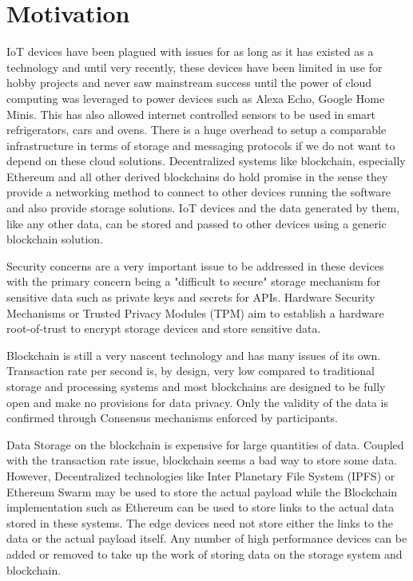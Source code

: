 \documentclass[11pt,openright]{report}
\begin{document}
\section{Motivation}\label{section:motivation}
IoT devices have been plagued with issues for as long as it has existed as a technology and until very recently, these devices have been limited in use for hobby projects and never saw mainstream success until the power of cloud computing was leveraged to power devices such as Alexa Echo, Google Home Minis. This has also allowed internet controlled sensors to be used in smart refrigerators, cars and ovens. There is a huge overhead to setup a comparable infrastructure in terms of storage and messaging protocols if we do not want to depend on these cloud solutions. Decentralized systems like blockchain, especially Ethereum \cite{7467408}  and all other derived blockchains do hold promise in the sense they provide a networking method to connect to other devices running the software and also provide storage solutions. IoT devices and the data generated by them, like any other data, can be stored and passed to other devices using a generic blockchain solution.

Security concerns are a very important issue to be addressed in these devices with the primary concern being a "difficult to secure" storage mechanism for sensitive data such as private keys and secrets for APIs. Hardware Security Mechanisms or Trusted Privacy Modules (TPM) aim to establish a hardware root-of-trust to encrypt storage devices and store sensitive data.

Blockchain is still a very nascent technology and has many issues of its own. Transaction rate per second is, by design, very low compared to traditional storage and processing systems and most blockchains are designed to be fully open and make no provisions for data privacy. Only the validity of the data is confirmed through Consensus mechanisms enforced by participants.

Data Storage on the blockchain is expensive for large quantities of data. Coupled with the transaction rate issue, blockchain seems a bad way to store some data. However, Decentralized technologies like Inter Planetary File System (IPFS) or Ethereum Swarm may be used to store the actual payload while the Blockchain implementation such as Ethereum can be used to store links to the actual data stored in these systems. The edge devices need not store either the links to the data or the actual payload itself. Any number of high performance devices can be added or removed to take up the work of storing data on the storage system and blockchain. 
\end{document}

